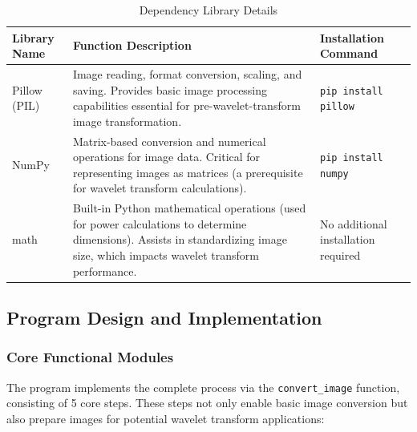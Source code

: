\documentclass{article}
\theoremstyle{definition} %
\begin{document}
\begin{table}[ht]
    \centering
    \begin{tabular}{|>{\arraybackslash}p{2cm}|>{\arraybackslash}p{7cm}|>{\arraybackslash}p{3.5cm}|}
        \hline
        \textbf{Library Name} & \textbf{Function Description}                                                                                                                                                    & \textbf{Installation Command}       \\
        \hline
        Pillow (PIL)          & Image reading, format conversion, scaling, and saving. Provides basic image processing capabilities essential for pre-wavelet-transform image transformation.                    & \texttt{pip install pillow}         \\
        \hline
        NumPy                 & Matrix-based conversion and numerical operations for image data. Critical for representing images as matrices (a prerequisite for wavelet transform calculations).               & \texttt{pip install numpy}          \\
        \hline
        math                  & Built-in Python mathematical operations (used for power calculations to determine dimensions). Assists in standardizing image size, which impacts wavelet transform performance. & No additional installation required \\
        \hline
    \end{tabular}
    \caption{Dependency Library Details}
\end{table}


\subsection{Program Design and Implementation}
\subsubsection{Core Functional Modules}
The program implements the complete process via the \texttt{convert\_image} function, consisting of 5 core steps. These steps not only enable basic image conversion but also prepare images for potential wavelet transform applications:
\end{document}
